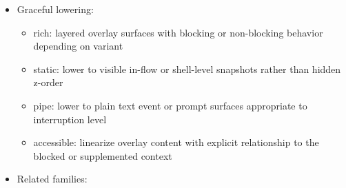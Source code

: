 \begin{itemize}
  \begin{itemize}
  \tightlist
  \item
    \texttt{t\allowbreak{}o\allowbreak{}o\allowbreak{}l\allowbreak{}t\allowbreak{}i\allowbreak{}p\allowbreak{}(\allowbreak{})} content should be short, local, and explanatory, not actionable or scrollable
  \item
    \texttt{d\allowbreak{}r\allowbreak{}a\allowbreak{}w\allowbreak{}e\allowbreak{}r\allowbreak{}(\allowbreak{})} content should support supplemental work, inspection, or side-by-side context without stealing the whole task
  \item
    \texttt{m\allowbreak{}o\allowbreak{}d\allowbreak{}a\allowbreak{}l\allowbreak{}(\allowbreak{})} content should justify blocking the user and should end in a clear decision, confirmation, or review step
  \item
    \texttt{t\allowbreak{}o\allowbreak{}a\allowbreak{}s\allowbreak{}t\allowbreak{}(\allowbreak{})} content should be short-lived and self-contained, not a surrogate notification center
  \item
    if the user may need recall, stacking, or routing, stop composing ad hoc \texttt{t\allowbreak{}o\allowbreak{}a\allowbreak{}s\allowbreak{}t\allowbreak{}(\allowbreak{})} overlays and move up to the notification system
  \item
    if the user still needs the main task visible and interactive, prefer \texttt{d\allowbreak{}r\allowbreak{}a\allowbreak{}w\allowbreak{}e\allowbreak{}r\allowbreak{}(\allowbreak{})} over \texttt{m\allowbreak{}o\allowbreak{}d\allowbreak{}a\allowbreak{}l\allowbreak{}(\allowbreak{})}
  \item
    when rich TUI structure matters, overlays should accept or compose structured \texttt{S\allowbreak{}u\allowbreak{}r\allowbreak{}f\allowbreak{}a\allowbreak{}c\allowbreak{}e} content instead of flattening component content into strings first
  \end{itemize}
\item
  Graceful lowering:

  \begin{itemize}
  \tightlist
  \item
    rich: layered overlay surfaces with blocking or non-blocking behavior depending on variant
  \item
    static: lower to visible in-flow or shell-level snapshots rather than hidden z-order
  \item
    pipe: lower to plain text event or prompt surfaces appropriate to interruption level
  \item
    accessible: linearize overlay content with explicit relationship to the blocked or supplemented context
  \end{itemize}
\item
  Related families:


\end{itemize}
